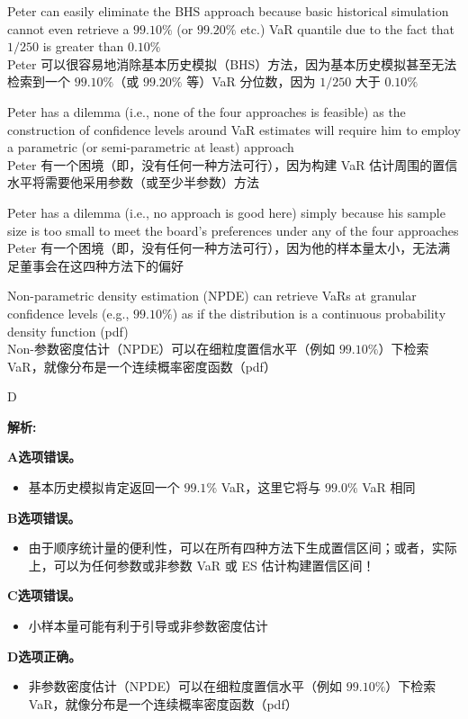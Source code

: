 \documentclass{article}
\newenvironment{explanation}
{\textbf{解析:}\par}
{\par}
\begin{document}
\begin{choices}
    \item Peter can easily eliminate the BHS approach because basic historical simulation cannot even retrieve a $99.10\%$ (or $99.20\%$ etc.) VaR quantile due to the fact that $1/250$ is greater than $0.10\%$\\
    Peter 可以很容易地消除基本历史模拟（BHS）方法，因为基本历史模拟甚至无法检索到一个 $99.10\%$（或 $99.20\%$ 等）VaR 分位数，因为 $1/250$ 大于 $0.10\%$
    \item Peter has a dilemma (i.e., none of the four approaches is feasible) as the construction of confidence levels around VaR estimates will require him to employ a parametric (or semi-parametric at least) approach\\
    Peter 有一个困境（即，没有任何一种方法可行），因为构建 VaR 估计周围的置信水平将需要他采用参数（或至少半参数）方法
    \item Peter has a dilemma (i.e., no approach is good here) simply because his sample size is too small to meet the board's preferences under any of the four approaches\\
    Peter 有一个困境（即，没有任何一种方法可行），因为他的样本量太小，无法满足董事会在这四种方法下的偏好
    \item Non-parametric density estimation (NPDE) can retrieve VaRs at granular confidence levels (e.g., $99.10\%$) as if the distribution is a continuous probability density function (pdf)\\
    Non-参数密度估计（NPDE）可以在细粒度置信水平（例如 $99.10\%$）下检索 VaR，就像分布是一个连续概率密度函数（pdf）
\end{choices}

\begin{correctanswer}
D
\end{correctanswer}

\begin{explanation}

    \textbf{A选项错误。}
    \begin{itemize}
        \item 基本历史模拟肯定返回一个 $99.1\%$ VaR，这里它将与 $99.0\%$ VaR 相同
    \end{itemize}

    \textbf{B选项错误。}
    \begin{itemize}
        \item 由于顺序统计量的便利性，可以在所有四种方法下生成置信区间；或者，实际上，可以为任何参数或非参数 VaR 或 ES 估计构建置信区间！
    \end{itemize}

    \textbf{C选项错误。}
    \begin{itemize}
        \item 小样本量可能有利于引导或非参数密度估计
    \end{itemize}

    \textbf{D选项正确。}
    \begin{itemize}
        \item 非参数密度估计（NPDE）可以在细粒度置信水平（例如 $99.10\%$）下检索 VaR，就像分布是一个连续概率密度函数（pdf）
    \end{itemize}
\end{explanation}
\end{document}
